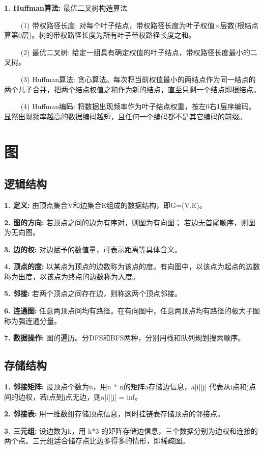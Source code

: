 \textbf{1. Huffman算法: }最优二叉树构造算法

~~~~ (1) 带权路径长度: 对每个叶子结点，带权路径长度为叶子权值$\times$层数(根结点算第0层)。树的带权路径长度为所有叶子带权路径长度之和。

~~~~ (2) 最优二叉树: 给定一组具有确定权值的叶子结点，带权路径长度最小的二叉树。

~~~~ (3) Huffman算法: 贪心算法。每次将当前权值最小的两结点作为同一结点的两个儿子合并，把两个结点权值之和作为新的结点，直至只剩一个结点即根结点。

~~~~ (4) Huffman编码: 将数据出现频率作为叶子结点权重，按左0右1层序编码。显然出现频率越高的数据编码越短，且任何一个编码都不是其它编码的前缀。

\section{图}

\subsection{逻辑结构}

\textbf{1. 定义: }由顶点集合V和边集合E组成的数据结构，即G=(V,E)。

\textbf{2. 图的方向: }若顶点之间的边为有序对，则图为有向图； 若边无首尾顺序，则图为无向图。

\textbf{3. 边的权: }对边赋予的数值量，可表示距离等具体含义。

\textbf{4. 顶点的度: }以某点为顶点的边数称为该点的度。有向图中，以该点为起点的边数称为出度，以该点为终点的边数称为入度。

\textbf{5. 邻接: }若两个顶点之间存在边，则称这两个顶点邻接。

\textbf{6. 连通图: }任意两顶点间均有路径。在有向图中，任意两顶点均有路径的极大子图称为强连通分量。

\textbf{7. 数据操作: }图的遍历。分DFS和BFS两种，分别用栈和队列规划搜索顺序。

\subsection{存储结构}

\textbf{1. 邻接矩阵: }设顶点个数为n，用n * n的矩阵a存储边信息，a[i][j] 代表从i点和j点间的边权，若i点到j点无边，则a[i][j] = inf。

\textbf{2. 邻接表: }用一维数组存储顶点信息，同时挂链表存储顶点的邻接点。

\textbf{3. 三元组: }设边数为k，用 k*3 的矩阵存储边信息，三个数据分别为边权和连接的两个点。三元组适合储存点比边多得多的情形，即稀疏图。

